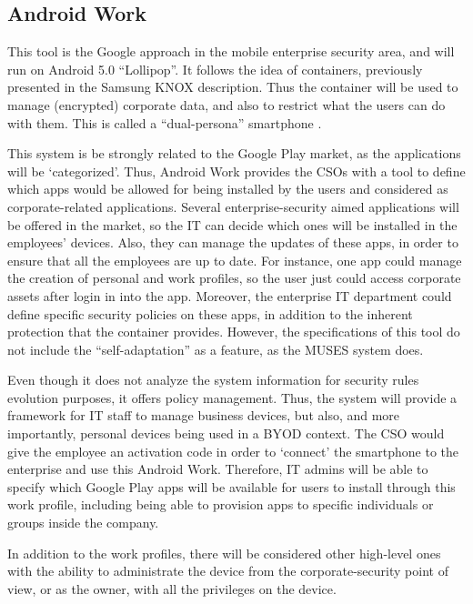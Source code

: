 
\subsection{Android Work}
\label{subsec:androidwork}

This tool is the Google approach in the mobile enterprise security area, and  will run on Android 5.0 ``Lollipop''. It follows the idea of containers, previously presented in the Samsung KNOX description. Thus the container will be used to manage (encrypted) corporate data, and also to restrict what the users can do with them. This is called a ``dual-persona'' smartphone \cite{AndroidWork_review}.

This system is be strongly related to the Google Play market, as the applications will be `categorized'. Thus, Android Work provides the CSOs with a tool to define which apps would be allowed for being installed by the users and considered as corporate-related applications. Several enterprise-security aimed applications will be offered in the market, so the IT can decide which ones will be installed in the employees' devices. Also, they can manage the updates of these apps, in order to ensure that all the employees are up to date. For instance, one app could manage the creation of personal and work profiles, so the user just could access corporate assets after login in into the app. Moreover, the enterprise IT department could define specific security policies on these apps, in addition to the inherent protection that the container provides. However, the specifications of this tool \cite{AndroidWork_tool} do not include the ``self-adaptation'' as a feature, as the MUSES system does. 

Even though it does not analyze the system information for security rules evolution purposes, it offers policy management. Thus, the system will provide a framework for IT staff to manage business devices, but also, and more importantly, personal devices being used in a BYOD context. The CSO would give the employee an activation code in order to `connect' the smartphone to the enterprise and use this Android Work.
Therefore, IT admins will be able to specify which Google Play apps will be available for users to install through this work profile, including being able to provision apps to specific individuals or groups inside the company.

In addition to the work profiles, there will be considered other high-level ones with the ability to administrate the device from the corporate-security point of view, or as the owner, with all the privileges on the device.

